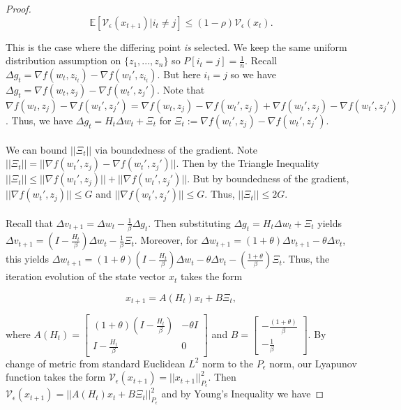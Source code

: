 \documentclass[twoside,11pt]{article}
\begin{document}
\begin{proof}
\begin{equation}
\mathbb{E}[\mathcal{V}_{\epsilon}(x_{t+1}) | i_t \neq j] \leq (1-\rho) \mathcal{V}_{\epsilon}(x_t).
\end{equation}

\noindent
{} This is the case where the differing point \textit{is} selected. We keep the same uniform distribution assumption on $\{z_1, ..., z_n\}$ so $P[i_t = j] = \frac{1}{n}$. Recall $\Delta g_t = \nabla f(w_t, z_{i_t}) - \nabla f(w_t', z_{i_t})$. But here $i_t = j$ so we have $\Delta g_t = \nabla f(w_t, z_j) - \nabla f(w_t', z_j')$. Note that $\nabla f(w_t, z_j) - \nabla f(w_t', z_j') = \nabla f(w_t, z_j) - \nabla f(w_t', z_j) + \nabla f(w_t', z_j) - \nabla f(w_t', z_j')$. Thus, we have $\Delta g_t = H_t\Delta w_t + \Xi_t$ for $\Xi_t := \nabla f(w_t', z_j) - \nabla f(w_t', z_j')$. \\
\\
We can bound $||\Xi_t||$ via boundedness of the gradient. Note $||\Xi_t|| = ||\nabla f(w_t', z_j) - \nabla f(w_t', z_j')||$. Then by the Triangle Inequality $||\Xi_t|| \leq ||\nabla f(w_t', z_j)|| + ||\nabla f(w_t', z_j')||$. But by boundedness of the gradient, $||\nabla f(w_t', z_j)|| \leq G$ and $||\nabla f (w_t', z_j')|| \leq G$. Thus, $||\Xi_t|| \leq 2G$. \\
\\
Recall that $\Delta v_{t+1} = \Delta w_t - \frac{1}{\beta}\Delta g_t$. Then substituting $\Delta g_t = H_t \Delta w_t + \Xi_t$ yields $\Delta v_{t+1} = (I - \frac{H_t}{\beta})\Delta w_t - \frac{1}{\beta} \Xi_t$. Moreover, for $\Delta w_{t+1} = (1+\theta)\Delta v_{t+1} - \theta \Delta v_t$, this yields $\Delta w_{t+1} = (1+\theta)(I - \frac{H_t}{\beta})\Delta w_t - \theta \Delta v_t - (\frac{1+\theta}{\beta})\Xi_t$. Thus, the iteration evolution of the state vector $x_t$ takes the form

\begin{equation}
x_{t+1} = A(H_t)x_t + B\Xi_t,
\end{equation}

\noindent
where $A(H_t) = \begin{bmatrix}
    (1+\theta)(I-\frac{H_t}{\beta}) & -\theta I \\
    I-\frac{H_t}{\beta} & 0
\end{bmatrix}$ and $B = \begin{bmatrix}
    -\frac{(1+\theta)}{\beta} \\
    -\frac{1}{\beta}
\end{bmatrix}$. By change of metric from standard Euclidean $L^2$ norm to the $P_{\epsilon}$ norm, our Lyapunov function takes the form $\mathcal{V}_{\epsilon}(x_{t+1}) = ||x_{t+1}||^2_{P_{\epsilon}}$. Then $\mathcal{V}_{\epsilon}(x_{t+1}) = ||A(H_t)x_t + B\Xi_t||^2_{P_{\epsilon}}$ and by Young's Inequality we have


\end{proof}
\end{document}
